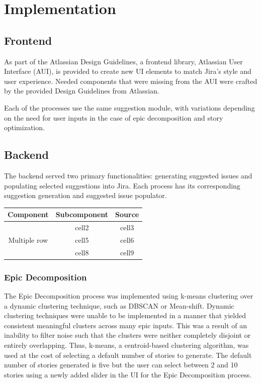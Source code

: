 \section{Implementation}

\subsection{Frontend}

As part of the Atlassian Design Guidelines, a frontend library, Atlassian User Interface (AUI), is provided to create new UI elements to match Jira’s style and user experience. Needed components that were missing from the AUI were crafted by the provided Design Guidelines from Atlassian. 

Each of the processes use the same suggestion module, with variations depending on the need for user inputs in the case of epic decomposition and story optimization. 


\subsection{Backend}

The backend served two primary functionalities: generating suggested issues and populating selected suggestions into Jira. Each process has its corresponding suggestion generation and suggested issue populator.

\begin{center}
\begin{tabular}{ |c|c|c| } 
\hline
Component & Subcomponent & Source \\
\hline
\multirow{4}{4em}{Multiple row} & cell2 & cell3 \\ 
& cell5 & cell6 \\ 
& cell8 & cell9 \\ 
\hline
\end{tabular}
\end{center}

\subsubsection{Epic Decomposition}
The Epic Decomposition process was implemented using k-means clustering over a dynamic clustering technique, such as DBSCAN or Mean-shift. Dynamic clustering techniques were unable to be implemented in a manner that yielded consistent meaningful clusters across many epic inputs. This was a result of an inability to filter noise such that the clusters were neither completely disjoint or entirely overlapping. Thus, k-means, a centroid-based clustering algorithm, was used at the cost of selecting a default number of stories to generate. The default number of stories generated is five but the user can select between 2 and 10 stories using a newly added slider in the UI for the Epic Decomposition process.

